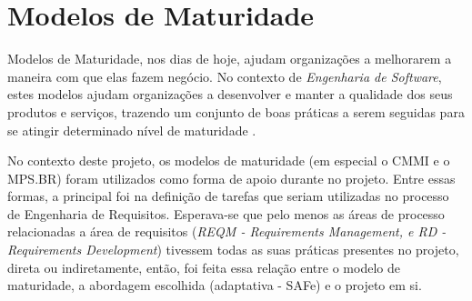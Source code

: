 \chapter[Modelos de Maturidade]{Modelos de Maturidade}
Modelos de Maturidade, nos dias de hoje, ajudam organizações a melhorarem a maneira com que elas fazem negócio. No contexto de \emph{Engenharia de Software}, estes modelos ajudam organizações a desenvolver e manter a qualidade dos seus produtos e serviços, trazendo um conjunto de boas práticas a serem seguidas para se atingir determinado nível de maturidade \cite{cmmi001}.

No contexto deste projeto, os modelos de maturidade (em especial o CMMI e o MPS.BR) foram utilizados como forma de apoio durante no projeto. Entre essas formas, a principal foi na definição de tarefas que seriam utilizadas no processo de Engenharia de Requisitos. Esperava-se que pelo menos as áreas de processo relacionadas a área de requisitos (\emph{REQM - Requirements Management, e RD - Requirements Development}) tivessem todas as suas práticas presentes no projeto, direta ou indiretamente, então, foi feita essa relação entre o modelo de maturidade, a abordagem escolhida (adaptativa - SAFe) e o projeto em si.